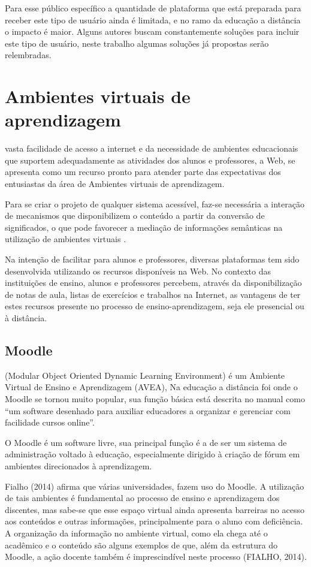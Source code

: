 \documentclass[12pt,journal,compsoc]{IEEEtran}
\begin{document}
Para esse público específico a quantidade de plataforma que está preparada para receber este tipo de usuário ainda é limitada, e no 
ramo da educação a distância o impacto é maior.
Alguns autores buscam constantemente soluções para incluir este tipo de usuário, neste trabalho algumas soluções já propostas
serão relembradas.

\section{Ambientes virtuais de aprendizagem}
 vasta facilidade de acesso a internet e da necessidade de ambientes educacionais que suportem 
adequadamente as atividades dos alunos e professores, a Web, se apresenta como um recurso pronto para atender 
parte das expectativas dos entusiastas da área de Ambientes virtuais de aprendizagem.

Para se criar o projeto de qualquer sistema acessível, faz-se necessária a interação de mecanismos que disponibilizem o 
conteúdo a partir da conversão de significados, o que pode favorecer a mediação de informações semânticas na utilização 
de ambientes virtuais \cite{Paper2008}.

Na intenção de facilitar para alunos e professores, diversas plataformas tem sido desenvolvida utilizando os recursos 
disponíveis na Web. No contexto das instituições de ensino, alunos e professores percebem, através da disponibilização 
de notas de aula, listas de exercícios e trabalhos na Internet, as vantagens de ter estes recursos presente no processo 
de ensino-aprendizagem, seja ele presencial ou à distância.

\subsection{Moodle}
 (Modular Object Oriented Dynamic Learning Environment) é um Ambiente Virtual de Ensino e Aprendizagem (AVEA), 
Na educação a distância foi onde o Moodle se tornou muito popular, sua função básica está descrita no manual como 
“um software desenhado para auxiliar educadores a organizar e gerenciar com facilidade cursos online”. 

O Moodle é um software livre, sua principal função é a de ser um sistema de administração voltado à educação, especialmente dirigido 
à criação de fórum em ambientes direcionados à aprendizagem.

Fialho (2014) afirma que várias universidades, fazem uso do Moodle. A utilização de tais ambientes é fundamental ao processo de ensino e 
aprendizagem dos discentes, mas sabe-se que esse espaço virtual ainda apresenta barreiras no acesso aos conteúdos e 
outras informações, principalmente para o aluno com deficiência. A organização da informação no ambiente virtual, como 
ela chega até o acadêmico e o conteúdo são alguns exemplos de que, além da estrutura do Moodle, a ação docente 
também é imprescindível neste processo (FIALHO, 2014).
\end{document}

